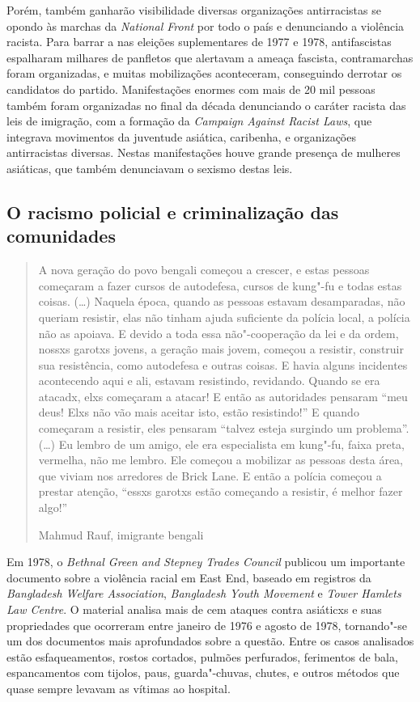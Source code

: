 Porém, também ganharão visibilidade diversas organizações antirracistas se opondo às marchas da \emph{National Front} por todo o país e denunciando a violência racista. Para barrar a  nas eleições suplementares de 1977 e 1978, antifascistas espalharam milhares de panfletos que alertavam a ameaça fascista, contramarchas foram organizadas, e muitas mobilizações aconteceram, conseguindo derrotar os candidatos do partido. Manifestações enormes com mais de 20 mil pessoas também foram organizadas no final da década denunciando o caráter racista das leis de imigração, com a formação da \emph{Campaign Against Racist Laws}, que integrava movimentos da juventude asiática, caribenha, e organizações antirracistas diversas. Nestas manifestações houve grande presença de mulheres asiáticas, que também denunciavam o sexismo destas leis.

\subsection{O racismo policial e criminalização das comunidades}

\begin{quote}
A nova geração do povo bengali começou a crescer, e estas pessoas começaram a fazer cursos de autodefesa, cursos de kung"-fu e todas estas coisas. (\ldots{}) Naquela época, quando as pessoas estavam desamparadas, não queriam resistir, elas não tinham ajuda suficiente da polícia local, a polícia não as apoiava. E devido a toda essa não"-cooperação da lei e da ordem, nossxs garotxs jovens, a geração mais jovem, começou a resistir, construir sua resistência, como autodefesa e outras coisas. E havia alguns incidentes acontecendo aqui e ali, estavam resistindo, revidando. Quando se era atacadx, elxs começaram a atacar! E então as autoridades pensaram ``meu deus! Elxs não vão mais aceitar isto, estão resistindo!'' E quando começaram a resistir, eles pensaram ``talvez esteja surgindo um problema''. (\ldots{}) Eu lembro de um amigo, ele era especialista em kung"-fu, faixa preta, vermelha, não me lembro. Ele começou a mobilizar as pessoas desta área, que viviam nos arredores de Brick Lane. E então a polícia começou a prestar atenção, ``essxs garotxs estão começando a resistir, é melhor fazer algo!''

Mahmud Rauf, imigrante bengali
\end{quote}

Em 1978, o \emph{Bethnal Green and Stepney Trades Council} publicou um importante documento sobre a violência racial em East End, baseado em registros da \emph{Bangladesh Welfare Association}, \emph{Bangladesh Youth Movement} e \emph{Tower Hamlets Law Centre}. O material analisa mais de cem ataques contra asiáticxs e suas propriedades que ocorreram entre janeiro de 1976 e agosto de 1978, tornando"-se um dos documentos mais aprofundados sobre a questão. Entre os casos analisados estão esfaqueamentos, rostos cortados, pulmões perfurados, ferimentos de bala, espancamentos com tijolos, paus, guarda"-chuvas, chutes, e outros métodos que quase sempre levavam as vítimas ao hospital.

